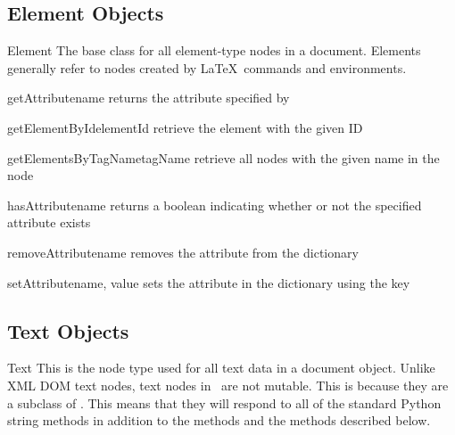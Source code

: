 \subsection{Element Objects}

\begin{classdesc}{Element}{}
The base class for all element-type nodes in a document.  Elements generally
refer to nodes created by \LaTeX\ commands and environments.
\end{classdesc}

\begin{methoddesc}[Element]{getAttribute}{name}
returns the attribute specified by 
\end{methoddesc}

\begin{methoddesc}[Element]{getElementById}{elementId}
retrieve the element with the given ID
\end{methoddesc}

\begin{methoddesc}[Element]{getElementsByTagName}{tagName}
retrieve all nodes with the given name in the node
\end{methoddesc}

\begin{methoddesc}[Element]{hasAttribute}{name}
returns a boolean indicating whether or not the specified attribute exists
\end{methoddesc}

\begin{methoddesc}[Element]{removeAttribute}{name}
removes the attribute  from the  dictionary
\end{methoddesc}

\begin{methoddesc}[Element]{setAttribute}{name, value}
sets the attribute  in the  dictionary
using the key 
\end{methoddesc}


\subsection{Text Objects}

\begin{classdesc}{Text}{}
This is the node type used for all text data in a document object.
Unlike XML DOM text nodes, text nodes in \plasTeX\ are 
not mutable.  This is because they are a subclass of .
This means that they will respond to all of the standard Python
string methods in addition to the  methods and the methods
described below.
\end{classdesc}

